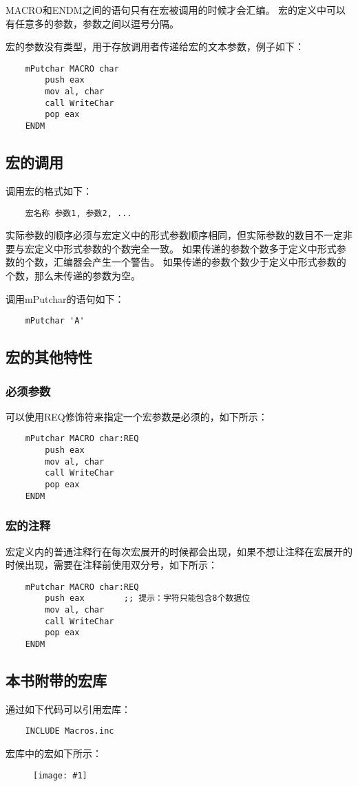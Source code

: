\documentclass[a4paper,left=2.5cm,right=2.5cm,11pt]{article}
\newcommand{\fic}[1]{\begin{figure}[H]
		\center
		\texttt{[image: \#1]}
	\end{figure}}
\begin{document}
	MACRO和ENDM之间的语句只有在宏被调用的时候才会汇编。
	宏的定义中可以有任意多的参数，参数之间以逗号分隔。\par

	宏的参数没有类型，用于存放调用者传递给宏的文本参数，例子如下：
	\begin{lstlisting}
	mPutchar MACRO char
		push eax
		mov al, char
		call WriteChar
		pop eax
	ENDM
	\end{lstlisting}

\subsection{宏的调用}
	调用宏的格式如下：
	\begin{lstlisting}
	宏名称	参数1, 参数2, ...
	\end{lstlisting}

	实际参数的顺序必须与宏定义中的形式参数顺序相同，但实际参数的数目不一定非要与宏定义中形式参数的个数完全一致。
	如果传递的参数个数多于定义中形式参数的个数，汇编器会产生一个警告。
	如果传递的参数个数少于定义中形式参数的个数，那么未传递的参数为空。\par

	调用mPutchar的语句如下：
	\begin{lstlisting}
	mPutchar 'A'
	\end{lstlisting}

\subsection{宏的其他特性}
\subsubsection{必须参数}
	可以使用REQ修饰符来指定一个宏参数是必须的，如下所示：
	\begin{lstlisting}
	mPutchar MACRO char:REQ
		push eax
		mov al, char
		call WriteChar
		pop eax
	ENDM
	\end{lstlisting}

\subsubsection{宏的注释}
	宏定义内的普通注释行在每次宏展开的时候都会出现，如果不想让注释在宏展开的时候出现，需要在注释前使用双分号，如下所示：
	\begin{lstlisting}
	mPutchar MACRO char:REQ
		push eax		;; 提示：字符只能包含8个数据位
		mov al, char
		call WriteChar
		pop eax
	ENDM
	\end{lstlisting}

\subsection{本书附带的宏库}
	通过如下代码可以引用宏库：
	\begin{lstlisting}
	INCLUDE Macros.inc
	\end{lstlisting}

	宏库中的宏如下所示：
	\fic{2.png}
\end{document}

